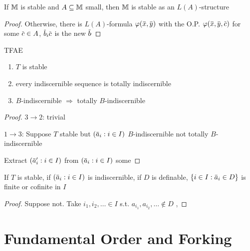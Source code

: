 \documentclass[11pt]{article}
\begin{document}
\begin{proposition}[]
If \(\mathbb{M}\) is stable and \(A\subseteq\mathbb{M}\) small, then \(\mathbb{M}\) is stable as an \(L(A)\)-structure
\end{proposition}

\begin{proof}
Otherwise, there is \(L(A)\)-formula \(\varphi(\barx,\bary)\) with the O.P.
\(\varphi(\barx,\bary,\barc)\) for some \(\barc\in A\), \(\barb_i\barc\) is the new \(\barb\)
\end{proof}

\begin{theorem}[]
TFAE
\begin{enumerate}
\item \(T\) is stable
\item every indiscernible sequence is totally indiscernible
\item \(B\)-indiscernible \(\Rightarrow\) totally \(B\)-indiscernible
\end{enumerate}
\end{theorem}

\begin{proof}
\(3\to 2\): trivial

\(1\to 3\): Suppose \(T\) stable but \((\bara_i:i\in I)\) \(B\)-indiscernible not
totally \(B\)-indiscernible

Extract \((\bara_i':i\in I)\) from \((\bara_i:i\in I)\) some
\end{proof}

\begin{corollary}[]
If \(T\) is stable, if \((\bara_i:i\in I)\) is indiscernible, if \(D\) is
definable, \(\{i\in I:\bara_i\in D\}\) is finite or cofinite in \(I\)
\end{corollary}

\begin{proof}
Suppose not. Take \(i_1,i_2,\dots\in I\) s.t. \(a_{i_1},a_{i_2},\dots\notin D\) , 
\end{proof}










\section{Fundamental Order and Forking}
\label{sec:orgea07af4}
\end{document}
